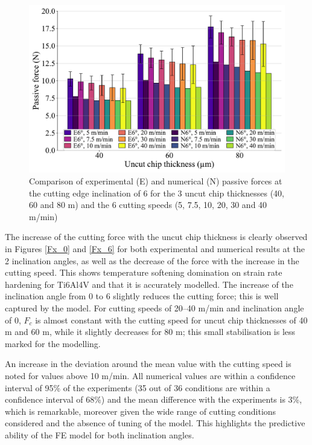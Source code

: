 \documentclass[preprint,12pt,times]{elsarticle}
\begin{document}
\begin{figure}[!h]
\centering
\includegraphics[width = 140 mm]{Figures/Fz_6}
\caption{Comparison of experimental (E) and numerical (N) passive forces at the cutting edge inclination of 6\textdegree{} for the 3 uncut chip thicknesses (40, 60 and 80 \textmu{}m) and the 6 cutting speeds (5, 7.5, 10, 20, 30 and 40 m/min)}
\label{Fz_6}
\end{figure}

The increase of the cutting force with the uncut chip thickness is clearly observed in Figures \ref{Fx_0} and \ref{Fx_6} for both experimental and numerical results at the 2 inclination angles, as well as the decrease of the force with the increase in the cutting speed. This shows temperature softening domination on strain rate hardening for Ti6Al4V and that it is accurately modelled. The increase of the inclination angle from 0\textdegree{} to 6\textdegree{} slightly reduces the cutting force; this is well captured by the model. For cutting speeds of 20--40 m/min and inclination angle of 0\textdegree{}, $F_c$ is almost constant with the cutting speed for uncut chip thicknesses of 40 \textmu{}m and 60 \textmu{}m, while it slightly decreases for 80 \textmu{}m; this small stabilisation is less marked for the modelling.

An increase in the deviation around the mean value with the cutting speed is noted for values above 10 m/min. All numerical values are within a confidence interval of 95\% of the experiments (35 out of 36 conditions are within a confidence interval of 68\%) and the mean difference with the experiments is 3\%, which is remarkable, moreover given the wide range of cutting conditions considered and the absence of tuning of the model. This highlights the predictive ability of the FE model for both inclination angles.
\end{document}

